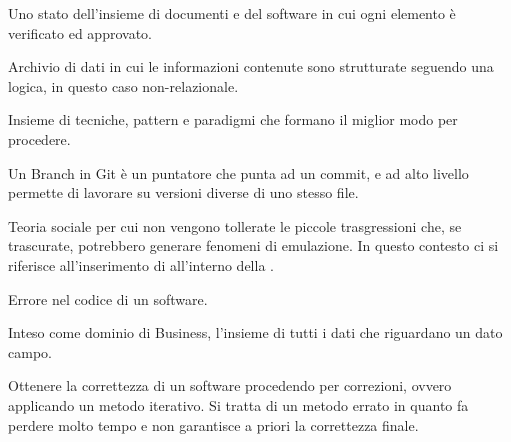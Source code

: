 
\begin{itemize}


Uno stato dell'insieme di documenti e del software in cui ogni elemento è verificato ed approvato.


Archivio di dati in cui le informazioni contenute sono strutturate seguendo una logica, in questo caso non-relazionale.


Insieme di tecniche, pattern e paradigmi che formano il miglior modo per procedere.


Un Branch in Git è un puntatore che punta ad un commit, e ad alto livello permette di lavorare su versioni diverse di uno stesso file.


Teoria sociale per cui non vengono tollerate le piccole trasgressioni che, se trascurate, potrebbero generare fenomeni di emulazione. In questo contesto ci si riferisce all'inserimento di  all'interno della . 


Errore nel codice di un software.


Inteso come dominio di Business, l'insieme di tutti i dati che riguardano un dato campo.


Ottenere la correttezza di un software procedendo per correzioni, ovvero applicando un metodo iterativo. Si tratta di un metodo errato in quanto fa perdere molto tempo e non garantisce a priori la correttezza finale.

\end{itemize}


